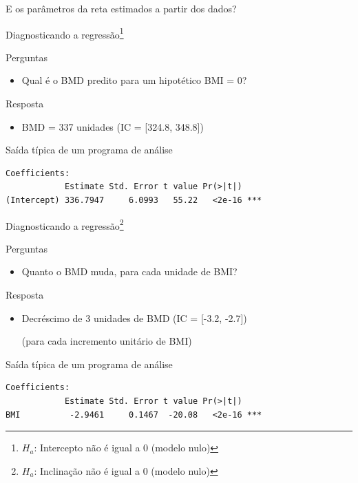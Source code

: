 \documentclass{beamer}
\begin{document}
\begin{frame}
  \begin{center}
    E os parâmetros da reta estimados a partir dos dados?
  \end{center}
\end{frame}

\begin{frame}[fragile]{Diagnosticando a regressão\footnote{\scriptsize $H_a$: Intercepto não é igual a 0 (modelo nulo)}}
  \begin{block}{Perguntas}
    \begin{itemize}
      \footnotesize
    \item Qual é o BMD predito para um hipotético BMI = 0?
    \end{itemize}
  \end{block}
  \bigskip
  \begin{exampleblock}{Resposta}
    \begin{itemize}
    \item BMD = 337 unidades \footnotesize (IC = [324.8, 348.8])
    \end{itemize}
  \end{exampleblock}
  \vfill
  \begin{exampleblock}{Saída típica de um programa de análise}
    \scriptsize
\begin{verbatim}
Coefficients:
            Estimate Std. Error t value Pr(>|t|)    
(Intercept) 336.7947     6.0993   55.22   <2e-16 ***
\end{verbatim}
\end{exampleblock}
\end{frame}

\begin{frame}[fragile]{Diagnosticando a regressão\footnote{\scriptsize $H_a$: Inclinação não é igual a 0 (modelo nulo)}}
  \begin{block}{Perguntas}
    \begin{itemize}
      \footnotesize
    \item Quanto o BMD muda, para cada unidade de BMI?
    \end{itemize}
  \end{block}
  \bigskip
    \begin{exampleblock}{Resposta}
      \begin{itemize}
      \item Decréscimo de 3 unidades de BMD \footnotesize (IC = [-3.2, -2.7])

        \bigskip
        \scriptsize (para cada incremento unitário de BMI)
    \end{itemize}
  \end{exampleblock}
  \vfill
  \begin{exampleblock}{Saída típica de um programa de análise}
    \scriptsize
\begin{verbatim}
Coefficients:
            Estimate Std. Error t value Pr(>|t|)    
BMI          -2.9461     0.1467  -20.08   <2e-16 ***
\end{verbatim}
\end{exampleblock}
\end{frame}
\end{document}
